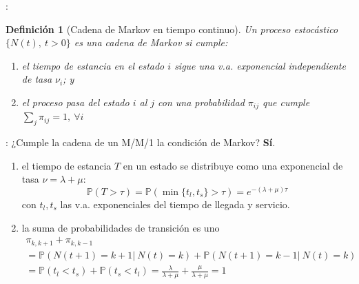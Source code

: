 \documentclass{beamer}
\newtheorem{definicion}{Definición}[section]
\begin{document}
\begin{frame}{\secname: \subsecname}
    \begin{definicion}[Cadena de Markov en tiempo continuo\cite{amable}]
        Un proceso estocástico
        $\{N(t),\ t>0\}$ es una cadena de Markov
        si cumple:
        \begin{enumerate}
            \item el tiempo de estancia
                en el estado $i$ sigue
                una v.a. exponencial
                independiente de tasa $\nu_i$; y
            \item el proceso pasa del estado
                $i$ al $j$ con una
                probabilidad $\pi_{ij}$
                que cumple
                $\sum_j \pi_{ij} = 1,\ \forall i$
        \end{enumerate}
    \end{definicion}
\end{frame}




\begin{frame}{\secname: \subsecname}
    ¿Cumple la cadena de un M/M/1 la condición
    de Markov? \pause \textbf{Sí}.

    \vfill

    \begin{enumerate}
        \item el tiempo de estancia $T$ en un
            estado se distribuye como una
            exponencial de tasa
            $\nu=\lambda+\mu$:
            \begin{equation*}
                \mathbb{P}(T>\tau)=\mathbb{P}(\min\{t_l,t_s\}>\tau)=e^{-(\lambda+\mu)\tau}
            \end{equation*}
            con $t_l,t_s$ las v.a.
            exponenciales del tiempo de
            llegada y servicio.

        \item la suma de probabilidades
            de transición es uno
            \begin{multline*}
                \pi_{k,k+1}+\pi_{k,k-1}\\
                =\mathbb{P}(N(t+1)=k+1|\ N(t)=k)
                + \mathbb{P}(N(t+1)=k-1|\ N(t)=k)\\
                = \mathbb{P}(t_l<t_s)
                + \mathbb{P}(t_s<t_l)
                = \frac{\lambda}{\lambda+\mu}
                + \frac{\mu}{\lambda+\mu} = 1
            \end{multline*}
    \end{enumerate}

\end{frame}
\end{document}
